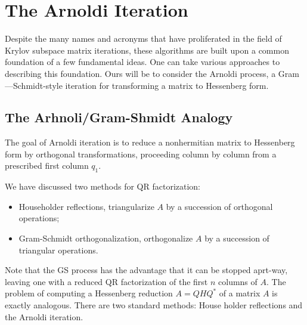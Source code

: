 \chapter{The Arnoldi Iteration}
Despite the many names and acronyms that have proliferated in the field of Krylov subspace matrix iterations, these algorithms are built upon a common foundation of a few fundamental ideas. One can take various approaches to describing this foundation. Ours will be to consider the Arnoldi process, a Gram—Schmidt-style iteration for transforming a matrix to Hessenberg form.

\section{The Arhnoli/Gram-Shmidt Analogy} 
The goal of Arnoldi iteration is to reduce a nonhermitian matrix to Hessenberg form by orthogonal transformations, proceeding column by column from a prescribed first column $ q_1 $.  

We have discussed two methods for QR factorization: 
\begin{itemize}
    \item Householder reflections, triangularize $ A $ by a succession of orthogonal operations;
    \item Gram-Schmidt orthogonalization, orthogonalize $A$ by a succession of triangular operations.
\end{itemize}
Note that the GS process has the advantage that it can be stopped aprt-way, leaving one with a reduced QR factorization of the first $ n $ columns of $ A $. The problem of computing a Hessenberg reduction $ A= QHQ^*  $ of a matrix $ A $ is exactly analogous. There are two standard methods: House holder reflections and the Arnoldi iteration.  

